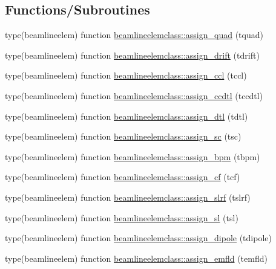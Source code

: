 \subsection*{Functions/\+Subroutines}
\begin{DoxyCompactItemize}
\item 
type(beamlineelem) function \mbox{\hyperlink{namespacebeamlineelemclass_aad515fd3f566490d835b1d406b23ea12}{beamlineelemclass\+::assign\+\_\+quad}} (tquad)
\item 
type(beamlineelem) function \mbox{\hyperlink{namespacebeamlineelemclass_a667b68ced2d4a0e5cd691d7d472a59ae}{beamlineelemclass\+::assign\+\_\+drift}} (tdrift)
\item 
type(beamlineelem) function \mbox{\hyperlink{namespacebeamlineelemclass_ac9b767ca614ed15fb347d385e982ef0d}{beamlineelemclass\+::assign\+\_\+ccl}} (tccl)
\item 
type(beamlineelem) function \mbox{\hyperlink{namespacebeamlineelemclass_a729afda498a0fcdb5c6625258a745a94}{beamlineelemclass\+::assign\+\_\+ccdtl}} (tccdtl)
\item 
type(beamlineelem) function \mbox{\hyperlink{namespacebeamlineelemclass_a56b55ab902212809615ff965f7e6591d}{beamlineelemclass\+::assign\+\_\+dtl}} (tdtl)
\item 
type(beamlineelem) function \mbox{\hyperlink{namespacebeamlineelemclass_a1e66e5399a7d4fc6fcfba7e3877f8d2e}{beamlineelemclass\+::assign\+\_\+sc}} (tsc)
\item 
type(beamlineelem) function \mbox{\hyperlink{namespacebeamlineelemclass_a078ba2f100d1ff9fe51c4ff957e30897}{beamlineelemclass\+::assign\+\_\+bpm}} (tbpm)
\item 
type(beamlineelem) function \mbox{\hyperlink{namespacebeamlineelemclass_ab5db1ddb5dbca2a72ab8efde22f2f90d}{beamlineelemclass\+::assign\+\_\+cf}} (tcf)
\item 
type(beamlineelem) function \mbox{\hyperlink{namespacebeamlineelemclass_a2ab33d7e54bdcb16b1f080eda6e520f2}{beamlineelemclass\+::assign\+\_\+slrf}} (tslrf)
\item 
type(beamlineelem) function \mbox{\hyperlink{namespacebeamlineelemclass_ad06dd33f09db1eab5304ec2a865a4b83}{beamlineelemclass\+::assign\+\_\+sl}} (tsl)
\item 
type(beamlineelem) function \mbox{\hyperlink{namespacebeamlineelemclass_ab472ce183e8b1faa6f40c494a9d8bc03}{beamlineelemclass\+::assign\+\_\+dipole}} (tdipole)
\item 
type(beamlineelem) function \mbox{\hyperlink{namespacebeamlineelemclass_ac9cc1a9326b192530803d06d2e8b088b}{beamlineelemclass\+::assign\+\_\+emfld}} (temfld)

\end{DoxyCompactItemize}
